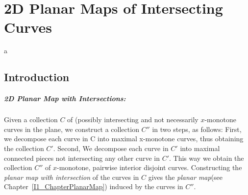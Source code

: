 
%
%
%
%
%
%
%
%
%
%
%
\chapter{2D Planar Maps of Intersecting Curves} \label{I1_ChapterPmwx}a

\section{Introduction}

\paragraph{2D Planar Map with Intersections:} 
  Given a collection $C$ of (possibly intersecting and not necessarily
  $x$-monotone curves in the plane, we construct a collection $C''$ in
  two steps, as follows: First, we decompose each curve in C into
  maximal x-monotone curves, thus obtaining the collection
  $C'$. Second, We decompose each curve in $C'$ into maximal connected
  pieces not intersecting any other curve in $C'$.  This way we obtain
  the collection $C''$ of $x$-monotone, pairwise interior disjoint
  curves.  Constructing the {\it planar map with intersection} of the
  curves in $C$ gives the {\it planar map}(see
  Chapter~\ref{I1_ChapterPlanarMap}) induced by the curves in $C''$.

